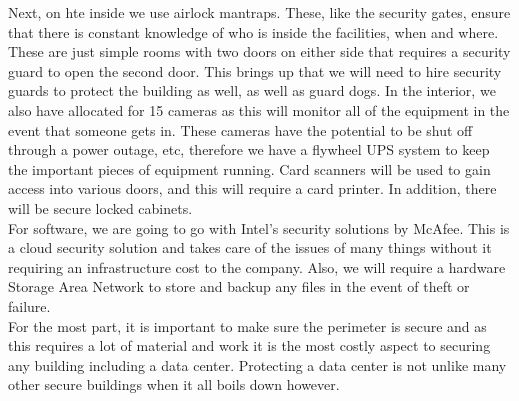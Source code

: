 \documentclass[a4paper, 11pt]{article}
\begin{document}
Next, on hte inside we use airlock mantraps.  These, like the security gates, ensure that there is constant knowledge of who is inside the facilities, when and where.  These are just simple rooms with two doors on either side that requires a security guard to open the second door.  This brings up that we will need to hire security guards to protect the building as well, as well as guard dogs.  In the interior, we also have allocated for 15 cameras as this will monitor all of the equipment in the event that someone gets in.  These cameras have the potential to be shut off through a power outage, etc, therefore we have a flywheel UPS system to keep the important pieces of equipment running.  Card scanners will be used to gain access into various doors, and this will require a card printer.  In addition, there will be secure locked cabinets.\\

For software, we are going to go with Intel's security solutions by McAfee.  This is a cloud security solution and takes care of the issues of many things without it requiring an infrastructure cost to the company.  Also, we will require a hardware Storage Area Network to store and backup any files in the event of theft or failure.\\

For the most part, it is important to make sure the perimeter is secure and as this requires a lot of material and work it is the most costly aspect to securing any building including a data center.  Protecting a data center is not unlike many other secure buildings when it all boils down however.
%
\end{document}
